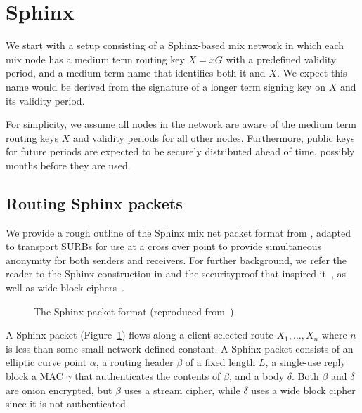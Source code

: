 
\section{Sphinx}\label{sec:sphinx}

We start with a setup consisting of a Sphinx-based mix network in
which each mix node has a medium term routing key $X = x G$ with a
predefined validity period, and a medium term name that identifies
both it and $X$.  We expect this name would be derived from the
signature of a longer term signing key on $X$ and its validity period.

For simplicity, we assume all nodes in the network are aware of the
medium term routing keys $X$ and validity periods for all other nodes.
Furthermore, public keys for future periods are expected to be
securely distributed ahead of time, possibly months before they are
used.


\subsection{Routing Sphinx packets}

We provide a rough outline of the Sphinx mix net packet format from 
\cite{Sphinx}, adapted to transport SURBs for use at a cross over point
to provide simultaneous anonymity for both senders and receivers.
For further background, we refer the reader to the Sphinx construction
in \cite{Sphinx} and the securityproof that inspired it~\cite{FormalOnion},
as well as wide block ciphers~\cite{Lionness}.

\begin{figure}
  \begin{center}
  
  \end{center}
  \caption{The Sphinx packet format (reproduced from~\cite{Sphinx}).}
  \label{fig:sphinx}
\end{figure}

A Sphinx packet (Figure~\ref{fig:sphinx}) flows along a client-selected
route $X_1,\ldots,X_n$ where $n$ is less than some small network defined
constant.  A Sphinx packet consists of an elliptic curve point $\alpha$,
a routing header $\beta$ of a fixed length $L$, a single-use reply block
a MAC $\gamma$ that authenticates the contents of $\beta$, and a body
$\delta$.  Both $\beta$ and $\delta$ are onion encrypted, but $\beta$
uses a stream cipher, while $\delta$ uses a wide block cipher since
it is not authenticated.

